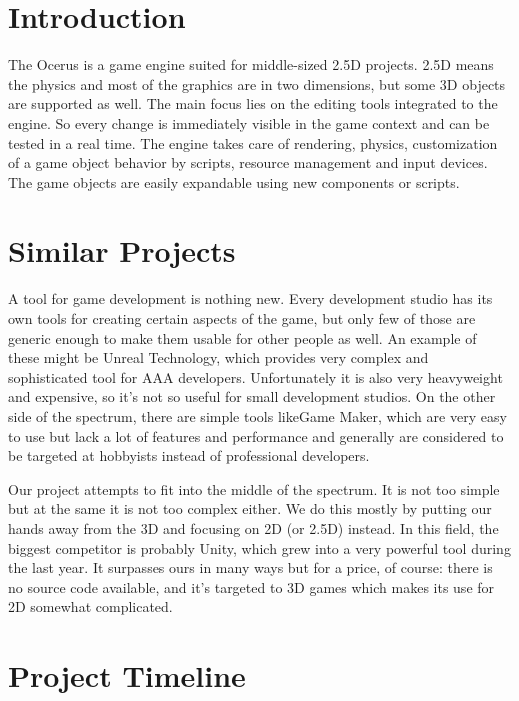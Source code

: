 \documentclass[a4paper,12pt]{article}
\title{\TitleText}
\author{http://ocerus.sourceforge.net}
\begin{document}
\maketitle
\clearpage


\section{Introduction}

The Ocerus is a game engine suited for middle-sized 2.5D projects. 2.5D means the physics and most of the graphics are in two dimensions, but some 3D objects are supported as well. The main focus lies on the editing tools integrated to the engine. So every change is immediately visible in the game context and can be tested in a real time. The engine takes care of rendering, physics, customization of a game object behavior by scripts, resource management and input devices. The game objects are easily expandable using new components or scripts.

\section{Similar Projects}
A tool for game development is nothing new. Every development studio has its own tools for creating certain aspects of the game, but only few of those are generic enough to make them usable for other people as well. An example of these might be Unreal Technology, which provides very complex and sophisticated tool for AAA developers. Unfortunately it is also very heavyweight and expensive, so it's not so useful for small development studios. On the other side of the spectrum, there are simple tools likeGame Maker, which are very easy to use but lack a lot of features and performance and generally are considered to be targeted at hobbyists instead of professional developers.

Our project attempts to fit into the middle of the spectrum. It is not too simple but at the same it is not too complex either. We do this mostly by putting our hands away from the 3D and focusing on 2D (or 2.5D) instead. In this field, the biggest competitor is probably Unity, which grew into a very powerful tool during the last year. It surpasses ours in many ways but for a price, of course: there is no source code available, and it's targeted to 3D games which makes its use for 2D somewhat complicated.

\section{Project Timeline}
\end{document}
